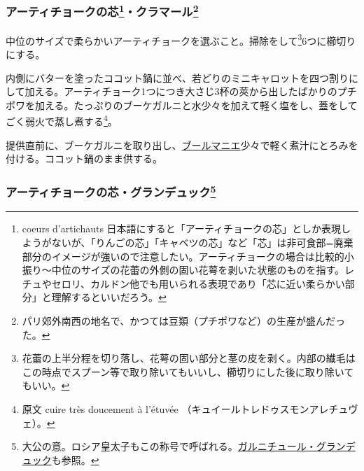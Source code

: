 \begin{recette}
\atoaki{}

\hypertarget{coeurs-d-artichauts-clamart}{%
\subsubsection[アーティチョークの芯・クラマール]{\texorpdfstring{アーティチョークの芯\footnote{coeurs
  d'artichauts
  日本語にすると「アーティチョークの芯」としか表現しようがないが、「りんごの芯」「キャベツの芯」など「芯」は非可食部=廃棄部分のイメージが強いので注意したい。アーティチョークの場合は比較的小振り〜中位のサイズの花蕾の外側の固い花萼を剥いた状態のものを指す。レチュやセロリ、カルドン他でも用いられる表現であり「芯に近い柔らかい部分」と理解するといいだろう。}・クラマール\footnote{パリ郊外南西の地名で、かつては豆類（プチポワなど）の生産が盛んだった。}}{アーティチョークの芯・クラマール}}\label{coeurs-d-artichauts-clamart}}



中位のサイズで柔らかいアーティチョークを選ぶこと。掃除をして\footnote{花蕾の上半分程を切り落し、花萼の固い部分と茎の皮を剥く。内部の繊毛はこの時点でスプーン等で取り除いてもいいし、櫛切りにした後に取り除いてもいい。}6つに櫛切りにする。

内側にバターを塗ったココット鍋に並べ、若どりのミニキャロットを四つ割りにして加える。アーティチョーク1つにつき大さじ3杯の莢から出したばかりのプチポワを加える。たっぷりのブーケガルニと水少々を加えて軽く塩をし、蓋をしてごく弱火で蒸し煮する\footnote{原文
  cuire très doucement à l'étuvée
  （キュイールトレドゥスモンアレチュヴェ）。}。

提供直前に、ブーケガルニを取り出し、\protect\hyperlink{beurre-manie}{ブールマニエ}少々で軽く煮汁にとろみを付ける。ココット鍋のまま供する。

\atoaki{}

\hypertarget{coeurs-d-artichauts-grand-duc}{%
\subsubsection[アーティチョークの芯・グランデュック]{\texorpdfstring{アーティチョークの芯・グランデュック\footnote{大公の意。ロシア皇太子もこの称号で呼ばれる。\href{garniture-grand-duc}{ガルニチュール・グランデュック}も参照。}}{アーティチョークの芯・グランデュック}}\label{coeurs-d-artichauts-grand-duc}}


\end{recette}
